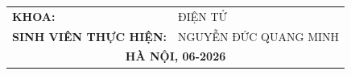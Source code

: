 \documentclass[DoAn.tex]{subfiles}
\begin{document}
\begin{titlepage}
\begin{center}
{\begin{table}[H]
{\begin{tabular}{ll}
          \multicolumn{1}{l}{\textbf{KHOA:}} & ĐIỆN TỬ \\ [0.5cm]
          \multicolumn{1}{l}{\textbf{SINH VIÊN THỰC HIỆN:}} & NGUYỄN ĐỨC QUANG MINH\quad 20224221\\ [3.5cm]
          \multicolumn{2}{c}{\large{\textbf{HÀ NỘI, 06-2026}}}
        \end{tabular}%
        }
    \end{table}}
  \end{center}

\end{titlepage}
\end{document}
